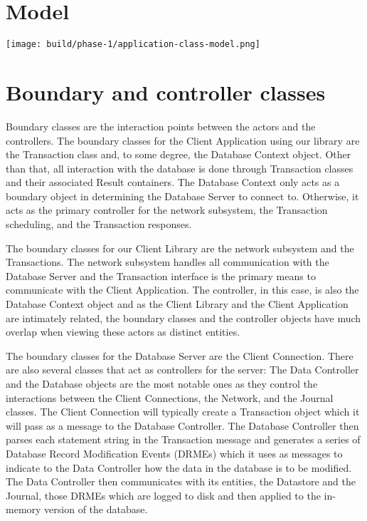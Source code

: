 \documentclass[a4paper]{report}
\begin{document}
\section{Model}

	\begin{center}
		\texttt{[image: build/phase-1/application-class-model.png]}
	\end{center}

	\pagebreak

\section{Boundary and controller classes}

	Boundary classes are the interaction points between the actors and the controllers. The boundary classes for the Client Application using our library are the Transaction class and, to some degree, the Database Context object. Other than that, all interaction with the database is done through Transaction classes and their associated Result containers. The Database Context only acts as a boundary object in determining the Database Server to connect to. Otherwise, it acts as the primary controller for the network subsystem, the Transaction scheduling, and the Transaction responses.

	The boundary classes for our Client Library are the network subsystem and the Transactions. The network subsystem handles all communication with the Database Server and the Transaction interface is the primary means to communicate with the Client Application. The controller, in this case, is also the Database Context object and as the Client Library and the Client Application are intimately related, the boundary classes and the controller objects have much overlap when viewing these actors as distinct entities.

	The boundary classes for the Database Server are the Client Connection. There are also several classes that act as controllers for the server: The Data Controller and the Database objects are the most notable ones as they control the interactions between the Client Connections, the Network, and the Journal classes. The Client Connection will typically create a Transaction object which it will pass as a message to the Database Controller. The Database Controller then parses each statement string in the Transaction message and generates a series of Database Record Modification Events (DRMEs) which it uses as messages to indicate to the Data Controller how the data in the database is to be modified. The Data Controller then communicates with its entities, the Datastore and the Journal, those DRMEs which are logged to disk and then applied to the in-memory version of the database.
\end{document}

